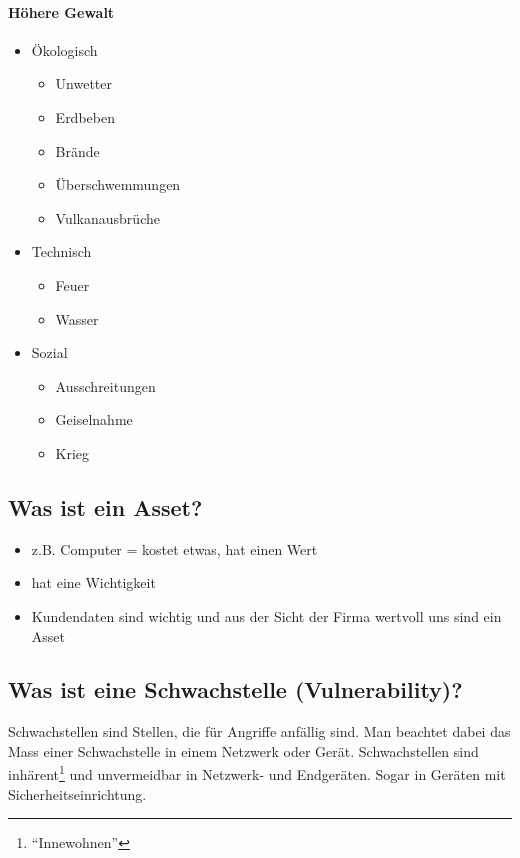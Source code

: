 \paragraph*{Höhere Gewalt}
\begin{itemize}
    \item Ökologisch
    \begin{itemize}
        \item Unwetter
        \item Erdbeben
        \item Brände
        \item Überschwemmungen
        \item Vulkanausbrüche
    \end{itemize}
    \item Technisch
    \begin{itemize}
        \item Feuer
        \item Wasser
    \end{itemize}
    \item Sozial
    \begin{itemize}
        \item Ausschreitungen
        \item Geiselnahme
        \item Krieg
    \end{itemize}
\end{itemize}

\subsection*{Was ist ein Asset?}
\begin{itemize}
    \item z.B. Computer = kostet etwas, hat einen Wert
    \item hat eine Wichtigkeit
    \item Kundendaten sind wichtig und aus der Sicht der Firma wertvoll uns sind ein Asset
\end{itemize}

\subsection*{Was ist eine Schwachstelle (Vulnerability)?}
Schwachstellen sind Stellen, die für Angriffe anfällig sind. Man beachtet dabei das Mass einer Schwachstelle in einem Netzwerk oder Gerät. Schwachstellen sind inhärent\footnote{"`Innewohnen"'} und unvermeidbar in Netzwerk- und Endgeräten. Sogar in Geräten mit Sicherheitseinrichtung.

